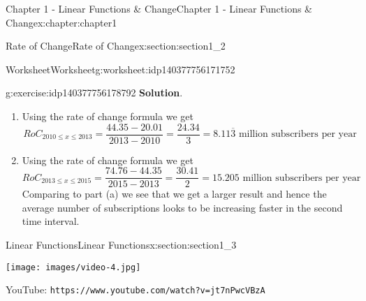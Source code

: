 \documentclass[oneside,10pt,]{book}
\newcommand{\blocktitlefont}{\relax}
\newcommand{\mono}[1]{\texttt{#1}}
\newlength{\qrsize}
\newlength{\previewwidth}
\begin{document}
\begin{chapterptx}{Chapter 1 - Linear Functions \& Change}{}{Chapter 1 - Linear Functions \& Change}{}{}{x:chapter:chapter1}
\begin{sectionptx}{Rate of Change}{}{Rate of Change}{}{}{x:section:section1_2}
\begin{worksheet-subsection}{Worksheet}{}{Worksheet}{}{}{g:worksheet:idp140377756171752}
\begin{divisionexercise}{2}{}{}{g:exercise:idp140377756178792}
\textbf{\blocktitlefont Solution}.\hypertarget{g:solution:idp140377756186120}{}\quad{}%
\begin{enumerate}[label=(\alph*)]
\item{}Using the rate of change formula we get%
\begin{equation*}
RoC_{2010\leq x \leq 2013} = \frac{44.35-20.01}{2013-2010} = \frac{24.34}{3} = 8.11\overline{3} \text{ million subscribers per year}
\end{equation*}
%
\item{}Using the rate of change formula we get%
\begin{equation*}
RoC_{2013\leq x \leq 2015} = \frac{74.76-44.35}{2015-2013} = \frac{30.41}{2} = 15.205 \text{ million subscribers per year}
\end{equation*}
Comparing to part (a) we see that we get a larger result and hence the average number of subscriptions looks to be increasing faster in the second time interval.%
\end{enumerate}
\end{divisionexercise}%
%
\end{worksheet-subsection}
\restoregeometry
\end{sectionptx}
%
%
\typeout{************************************************}
\typeout{************************************************}
%
\begin{sectionptx}{Linear Functions}{}{Linear Functions}{}{}{x:section:section1_3}
\setlength{\qrsize}{9em}
\setlength{\previewwidth}{\linewidth}
\addtolength{\previewwidth}{-\qrsize}
\begin{tcbraster}[raster columns=2, raster column skip=1pt, raster halign=center, raster force size=false, raster left skip=0pt, raster right skip=0pt]%
\begin{tcolorbox}[previewstyle, width=\previewwidth]%
\texttt{[image: images/video-4.jpg]}%
\end{tcolorbox}%
\begin{tcolorbox}[qrstyle]%
{\hypersetup{urlcolor=black}}%
\end{tcolorbox}%
\begin{tcolorbox}[captionstyle]%
\small YouTube: \mono{https://www.youtube.com/watch?v=jt7nPwcVBzA}\end{tcolorbox}%

\end{tcbraster}
\end{sectionptx}
\end{chapterptx}
\end{document}
